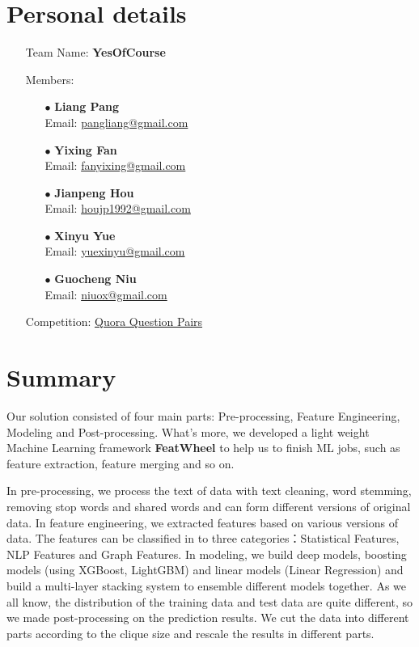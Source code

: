 \documentclass[12pt]{article}
\begin{document}
\section*{Personal details}
\begin{itemize}
\item[] Team Name: \textbf{YesOfCourse}
\item[] Members:
\begin{itemize}
\item[$\bullet$] \textbf{Liang Pang} \\
	Email: \url{pangliang@gmail.com}
\item[$\bullet$] \textbf{Yixing Fan} \\
	Email: \url{fanyixing@gmail.com}
\item[$\bullet$] \textbf{Jianpeng Hou} \\
	Email: \url{houjp1992@gmail.com}
\item[$\bullet$] \textbf{Xinyu Yue} \\
	Email: \url{yuexinyu@gmail.com}
\item[$\bullet$] \textbf{Guocheng Niu} \\
	Email: \url{niuox@gmail.com}
\end{itemize}
\item[] Competition: \href{https://www.kaggle.com/c/quora-question-pairs/}{Quora Question Pairs}
\end{itemize}

\newpage
\tableofcontents

\newpage


\section{Summary}

Our solution consisted of four main parts: Pre-processing, Feature Engineering, Modeling and Post-processing. What's more, we developed a light weight Machine Learning framework \textbf{FeatWheel} to help us to finish ML jobs, such as feature extraction, feature merging and so on.

In pre-processing, we process the text of data with text cleaning, word stemming, removing stop words and shared words and can form different versions of original data. In feature engineering, we extracted features based on various versions of data. The features can be classified in to three categories：Statistical Features, NLP Features and Graph Features. In modeling, we build deep models, boosting models (using XGBoost, LightGBM) and linear models (Linear Regression) and build a multi-layer stacking system to ensemble different models together. As we all know, the distribution of the training data and test data are quite different, so we made post-processing on the prediction results. We cut the data into different parts according to the clique size and rescale the results in different parts. 
\end{document}

